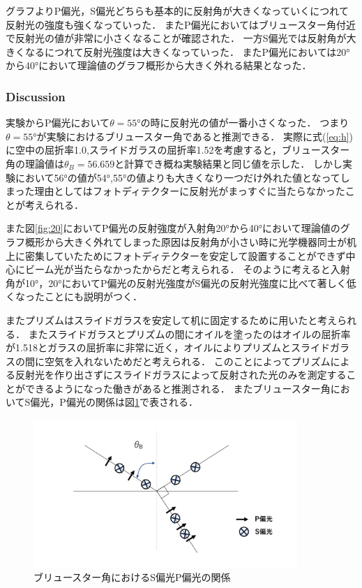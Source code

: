 \documentclass[11pt, a4paper]{jsarticle}
\begin{document}
グラフよりP偏光，S偏光どちらも基本的に反射角が大きくなっていくにつれて反射光の強度も強くなっていった．
またP偏光においてはブリュースター角付近で反射光の値が非常に小さくなることが確認された．
一方S偏光では反射角が大きくなるにつれて反射光強度は大きくなっていった．
またP偏光においては20°から40°において理論値のグラフ概形から大きく外れる結果となった．

\newpage
\subsubsection{Discussion}
実験からP偏光において$\theta=55°$の時に反射光の値が一番小さくなった．
つまり$\theta=55°$が実験におけるブリュースター角であると推測できる．
実際に式(\ref{eq:h})に空中の屈折率1.0,スライドガラスの屈折率1.52を考慮すると，ブリュースター角の理論値は$\theta_B=56.659$と計算でき概ね実験結果と同じ値を示した．
しかし実験において56°の値が54°,55°の値よりも大きくなり一つだけ外れた値となってしまった理由としてはフォトディテクターに反射光がまっすぐに当たらなかったことが考えられる．

また図\ref{fig:20}においてP偏光の反射強度が入射角20°から40°において理論値のグラフ概形から大きく外れてしまった原因は反射角が小さい時に光学機器同士が机上に密集していたためにフォトディテクターを安定して設置することができず中心にビーム光が当たらなかったからだと考えられる．
そのように考えると入射角が10°，20°においてP偏光の反射光強度がS偏光の反射光強度に比べて著しく低くなったことにも説明がつく．

またプリズムはスライドガラスを安定して机に固定するために用いたと考えられる．
またスライドガラスとプリズムの間にオイルを塗ったのはオイルの屈折率が1.518とガラスの屈折率に非常に近く，オイルによりプリズムとスライドガラスの間に空気を入れないためだと考えられる．
このことによってプリズムによる反射光を作り出さずにスライドガラスによって反射された光のみを測定することができるようになった働きがあると推測される．
またブリュースター角においてS偏光，P偏光の関係は図\ref{fig:25}で表される．

\begin{figure}[htbp]
 \begin{center}
  \includegraphics[width=10cm]{fig25.png}
 \end{center}
 \caption{ブリュースター角におけるS偏光P偏光の関係}
 \label{fig:25}
\end{figure}
\newpage
\end{document}

